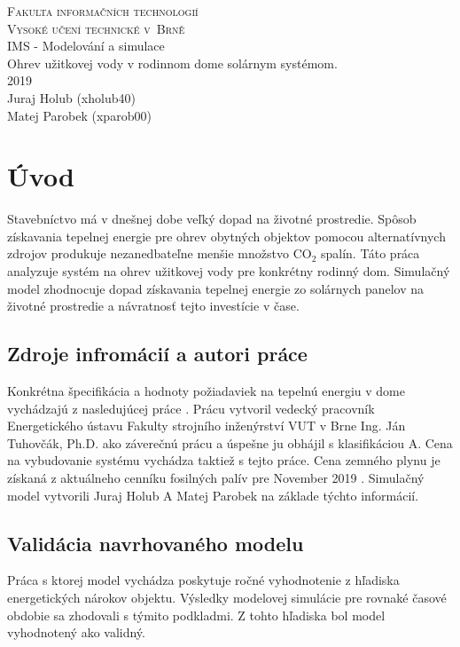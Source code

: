 \documentclass[a4paper, 11pt]{article}
\begin{document}
\begin{titlepage}
	\begin{center}
		\Huge
		\textsc{Fakulta informačních technologií \\
			Vysoké učení technické v~Brně} \\
		{\LARGE
			IMS - Modelování a simulace \\ 
			\medskip 
			\Large{
				Ohrev užitkovej vody v rodinnom dome solárnym systémom.
			}
			}
		\setlength{\parindent}{0.3em}\\
		{\Large 2019} \\
		{\Large Juraj Holub (xholub40)}\\
		{\Large Matej Parobek (xparob00)}
	\end{center}
\end{titlepage}

\tableofcontents
\newpage

\section{Úvod}
Stavebníctvo má v dnešnej dobe veľký dopad na životné prostredie. Spôsob získavania tepelnej energie pre ohrev obytných objektov pomocou alternatívnych zdrojov produkuje nezanedbateľne menšie množstvo CO$_2$ spalín. Táto práca analyzuje systém na ohrev užitkovej vody pre konkrétny rodinný dom. Simulačný model zhodnocuje dopad získavania tepelnej energie zo solárnych panelov na životné prostredie a návratnosť tejto investície v čase. 

\subsection{Zdroje infromácií a autori práce}
Konkrétna špecifikácia a hodnoty požiadaviek na tepelnú energiu v dome vychádzajú z nasledujúcej práce \cite{bc_solar_system}. Prácu vytvoril vedecký pracovník Energetického ústavu Fakulty strojního inženýrství VUT v Brne Ing. Ján Tuhovčák, Ph.D. ako záverečnú prácu a úspešne ju obhájil s klasifikáciou A. Cena na vybudovanie systému vychádza taktiež s tejto práce. Cena zemného plynu je získaná z aktuálneho cenníku fosilných palív pre November 2019 \cite{ceny_paliva}. Simulačný model vytvorili Juraj Holub A Matej Parobek na základe týchto informácií. 

\subsection{Validácia navrhovaného modelu}
Práca s ktorej model vychádza poskytuje ročné vyhodnotenie z hľadiska energetických nárokov objektu. Výsledky modelovej simulácie pre rovnaké časové obdobie sa zhodovali s týmito podkladmi. Z tohto hľadiska bol model vyhodnotený ako validný.
\end{document}
